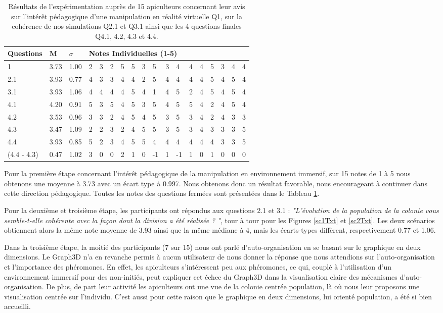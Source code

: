 	\begin{table}
	\centering
	\begin{tabular}{l|l|l|lllllllllllllll}
	\textbf{Questions} & \textbf{M} & \textbf{$\sigma$} & \multicolumn{15}{l}{\textbf{Notes Individuelles (1-5)}}\\
	\hline
	1 & 3.73 & 1.00          &2&3&2&5&5&3&5&3&4&4&4&5&3&4&4\\
	\hline
	2.1 & 3.93 & 0.77        &4&3&3&4&4&2&5&4&4&4&4&5&4&5&4\\
	\hline
	3.1 & 3.93 & 1.06        &4&4&4&4&5&4&1&4&5&2&4&5&4&5&4\\	
	\hline
	4.1 & 4.20 & 0.91        &5&3&5&4&5&3&5&4&5&5&4&2&4&5&4\\
	\hline
	4.2 & 3.53 & 0.96        &3&3&2&4&5&4&5&3&5&3&4&2&4&3&3\\
	\hline
	4.3 & 3.47 & 1.09        &2&2&3&2&4&5&5&3&5&3&4&3&3&3&5\\
	\hline
	4.4 & 3.93 & 0.85        &5&2&3&4&5&5&4&4&4&4&4&4&3&3&5\\
	\hline
	(4.4 - 4.3) & 0.47 & 1.02&3&0&0&2&1&0&-1&1&-1&1&0&1&0&0&0\\
	\end{tabular}
	\caption{Résultats de l'expérimentation auprès de 15 apiculteurs concernant leur avis sur l'intérêt pédagogique d'une manipulation en réalité virtuelle Q1, sur la cohérence de nos simulations Q2.1 et Q3.1 ainsi que les 4 questions finales Q4.1, 4.2, 4.3 et 4.4.}
	\label{TabResVR}
	\end{table}

	
	Pour la première étape concernant l'intérêt pédagogique de la manipulation en environnement immersif, sur 15 notes de 1 à 5 nous obtenons une moyenne à 3.73 avec un écart type à 0.997.  Nous obtenons donc un résultat favorable, nous encourageant à continuer dans cette direction pédagogique. Toutes les notes des questions fermées sont présentées dans le Tableau \ref{TabResVR}.
	
    Pour la deuxième et troisième étape, les participants ont répondus aux questions 2.1 et 3.1 : \textit{"L'évolution de la population de la colonie vous semble-t-elle cohérente avec la façon dont la division a été réalisée ? "}, tour à tour pour les Figures \ref{sc1Txt} et \ref{sc2Txt}. Les deux scénarios obtiennent alors la même note moyenne de 3.93 ainsi que la même médiane à 4, mais les écarts-types diffèrent, respectivement 0.77 et 1.06.
    
    Dans la troisième étape, la moitié des participants (7 sur 15) nous ont parlé d'auto-organisation en se basant sur le graphique en deux dimensions. Le Graph3D n'a en revanche permis à aucun utilisateur de nous donner la réponse que nous attendions sur l'auto-organisation et l'importance des phéromones. 
En effet, les apiculteurs s'intéressent peu aux phéromones, ce qui, couplé à l'utilisation d'un environnement immersif pour des non-initiés, peut expliquer cet échec du Graph3D dans la visualisation claire des mécanismes d'auto-organisation. De plus, de part leur activité les apiculteurs ont une vue de la colonie centrée population, là où nous leur proposons une visualisation centrée sur l'individu. C'est aussi pour cette raison que le graphique en deux dimensions, lui orienté population, a été si bien accueilli.

